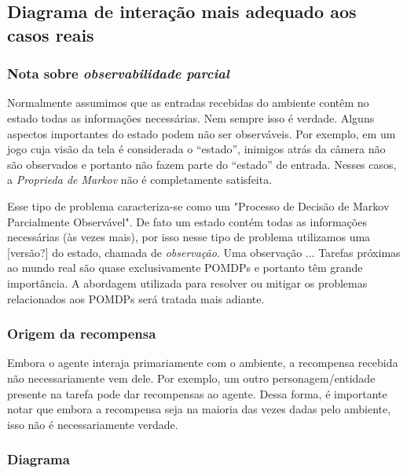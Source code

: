 \documentclass{article}
\begin{document}
        \subsection{Diagrama de interação mais adequado aos casos reais}
        
            \subsubsection{Nota sobre \emph{observabilidade parcial}}

                Normalmente assumimos que as entradas recebidas do ambiente contêm no estado todas as informações necessárias. Nem sempre isso é verdade. Alguns aspectos importantes do estado podem não ser observáveis. Por exemplo, em um jogo cuja visão da tela é considerada o ``estado'', inimigos atrás da câmera não são observados e portanto não fazem parte do ``estado'' de entrada. Nesses casos, a \emph{Proprieda de Markov} não é completamente satisfeita. 
                
                Esse tipo de problema caracteriza-se como um "Processo de Decisão de Markov Parcialmente Observável". De fato um estado contém todas as informações necessárias (às vezes mais), por isso nesse tipo de problema utilizamos uma [versão?] do estado, chamada de \emph{observação}. Uma observação ... Tarefas próximas ao mundo real são quase exclusivamente POMDPs e portanto têm grande importância. A abordagem utilizada para resolver ou mitigar os problemas relacionados aos POMDPs será tratada mais adiante.

            \subsubsection{Origem da recompensa}
            
                Embora o agente interaja primariamente com o ambiente, a recompensa recebida não necessariamente vem dele. Por exemplo, um outro personagem/entidade presente na tarefa pode dar recompensas ao agente. Dessa forma, é importante notar que embora a recompensa seja na maioria das vezes dadas pelo ambiente, isso não é necessariamente verdade.

            \subsubsection{Diagrama}
\end{document}
